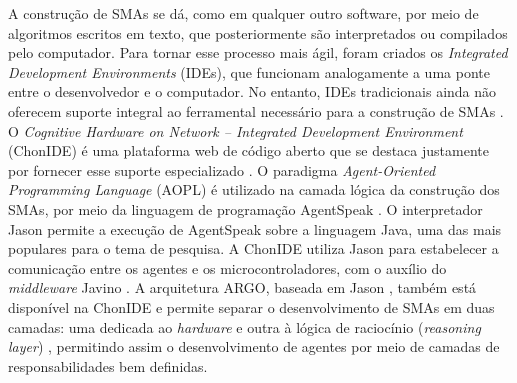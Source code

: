 A construção de SMAs se dá, como em qualquer outro software, por meio de algoritmos escritos em texto, que posteriormente são interpretados ou compilados pelo computador. Para tornar esse processo mais ágil, foram criados os \textit{Integrated Development Environments} (IDEs), que funcionam analogamente a uma ponte entre o desenvolvedor e o computador. No entanto, IDEs tradicionais ainda não oferecem suporte integral ao ferramental necessário para a construção de SMAs \cite{siqueira2024analise}. O \textit{Cognitive Hardware on Network – Integrated Development Environment} (ChonIDE) é uma plataforma web de código aberto que se destaca justamente por fornecer esse suporte especializado \cite{wesaac}. O paradigma \textit{Agent-Oriented Programming Language} (AOPL) é utilizado na camada lógica da construção dos SMAs, por meio da linguagem de programação AgentSpeak \cite{pantoja2016argo}. O interpretador Jason permite a execução de AgentSpeak sobre a linguagem Java, uma das mais populares para o tema de pesquisa. A ChonIDE utiliza Jason para estabelecer a comunicação entre os agentes e os microcontroladores, com o auxílio do \textit{middleware} Javino \cite{lazarin2015robotic}. A arquitetura ARGO, baseada em Jason \cite{pantoja2016argo}, também está disponível na ChonIDE e permite separar o desenvolvimento de SMAs em duas camadas: uma dedicada ao \textit{hardware} e outra à lógica de raciocínio (\textit{reasoning layer}) \cite{pantoja2016argo}, permitindo assim o desenvolvimento de agentes por meio de camadas de responsabilidades bem definidas.







